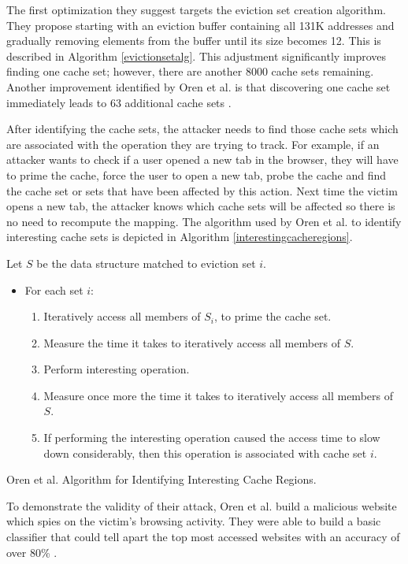 \documentclass[10pt,a4paper,twoside]{book}
\begin{document}
The first optimization they suggest targets the eviction set creation algorithm. They propose starting with an eviction buffer containing all 131K addresses and gradually removing elements from the buffer until its size becomes 12. This is described in Algorithm \ref{evictionsetalg}. This adjustment significantly improves finding one cache set; however, there are another 8000 cache sets remaining. Another improvement identified by Oren et al. is that discovering one cache set immediately leads to 63 additional cache sets \cite{oren2015spy}.

After identifying the cache sets, the attacker needs to find those cache sets which are associated with the operation they are trying to track. For example, if an attacker wants to check if a user opened a new tab in the browser, they will have to prime the cache, force the user to open a new tab, probe the cache and find the cache set or sets that have been affected by this action. Next time the victim opens a new tab, the attacker knows which cache sets will be affected so there is no need to recompute the mapping. The algorithm used by Oren et al. to identify interesting cache sets is depicted in Algorithm \ref{interestingcacheregions}.

\begin{algorithm}
Let $S$ be the data structure matched to eviction set $i$.
\begin{itemize}
\item For each set $i$:
\begin{enumerate}
\item Iteratively access all members of $S_i$, to prime the cache set.
\item Measure the time it takes to iteratively access all members of $S$.
\item Perform interesting operation.
\item Measure once more the time it takes to iteratively access all members of $S$.
\item If performing the interesting operation caused the access time to slow down considerably, then this operation is associated with cache set $i$.
\end{enumerate}
\end{itemize}
\caption{Oren et al. Algorithm for Identifying Interesting Cache Regions.}
\label{interestingcacheregions}
\end{algorithm}

To demonstrate the validity of their attack, Oren et al. build a malicious website which spies on the victim's browsing activity. They were able to build a basic classifier that could tell apart the top most accessed websites with an accuracy of over 80\% \cite{oren2015spy}.
\end{document}
